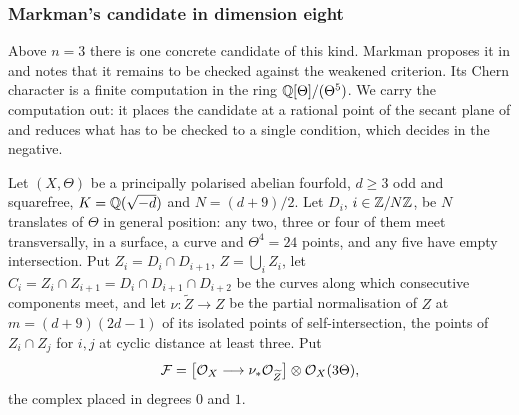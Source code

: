 \subsubsection*{Markman's candidate in dimension eight}

Above $n=3$ there is one concrete candidate of this kind. Markman proposes
it in \cite[Section 12]{Mar25b} and notes that it remains to be checked
against the weakened criterion. Its Chern character is a finite computation
in the ring $\mathbb{Q}[\Theta]/(\Theta^{5})$. We carry the computation out: it
places the candidate at a rational point of the secant plane of
 and reduces what has to be checked to a single
condition, which  decides in the negative.

\begin{setupenv}\label{setup:markman}
Let $(X,\Theta)$ be a principally polarised abelian fourfold, $d\ge3$ odd and
squarefree, $K=\mathbb{Q}(\sqrt{-d})$ and $N=(d+9)/2$. Let $D_{i}$, $i\in\mathbb{Z}/N\mathbb{Z}$,
be $N$ translates of $\Theta$ in general position: any two, three or four of
them meet transversally, in a surface, a curve and $\Theta^{4}=24$ points,
and any five have empty intersection. Put $Z_{i}=D_{i}\cap D_{i+1}$,
$Z=\bigcup_{i}Z_{i}$, let $C_{i}=Z_{i}\cap Z_{i+1}=D_{i}\cap D_{i+1}\cap D_{i+2}$
be the curves along which consecutive components meet, and let
$\nu\colon\widetilde{Z}\to Z$ be the partial normalisation of $Z$ at
$m=(d+9)(2d-1)$ of its isolated points of self-intersection, the points of
$Z_{i}\cap Z_{j}$ for $i,j$ at cyclic distance at least three. Put
\[
  \mathcal{F}=\bigl[\mathcal{O}_{X}\longrightarrow\nu_{*}\mathcal{O}_{\widetilde{Z}}\bigr]\otimes\mathcal{O}_{X}(3\Theta),
\]
the complex placed in degrees $0$ and $1$.
\end{setupenv}

